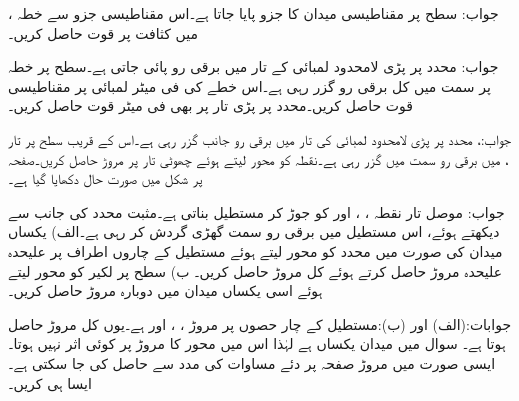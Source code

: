جواب:
سطح  پر مقناطیسی میدان کا  جزو  پایا جاتا ہے۔اس مقناطیسی جزو سے خطہ ،  میں کثافت  پر قوت حاصل کریں۔

جواب:
 محدد پر پڑی لامحدود لمبائی کے تار میں  برقی رو پائی جاتی ہے۔سطح  پر خطہ  پر  سمت میں کل  برقی رو گزر رہی ہے۔اس خطے کی فی میٹر لمبائی پر مقناطیسی قوت حاصل کریں۔محدد  پر پڑی تار پر بھی فی میٹر قوت حاصل کریں۔

جواب:، 
محدد  پر پڑی لامحدود لمبائی کی تار میں  برقی رو  جانب گزر رہی ہے۔اس کے قریب سطح  پر تار ،  میں  برقی رو  سمت میں گزر رہی ہے۔نقطہ  کو محور لیتے ہوئے چھوٹی تار پر مروڑ حاصل کریں۔صفحہ  پر شکل  میں صورت حال دکھایا گیا ہے۔

جواب:
موصل تار نقطہ ، ،  اور  کو جوڑ کر مستطیل بناتی ہے۔مثبت  محدد کی جانب سے دیکھتے ہوئے، اس مستطیل میں  برقی رو سمت گھڑی گردش کر رہی ہے۔الف)  یکساں میدان  کی صورت میں  محدد  کو محور لیتے ہوئے مستطیل کے چاروں اطراف پر علیحدہ علیحدہ  مروڑ حاصل کرتے ہوئے کل مروڑ حاصل کریں۔ ب) سطح  پر لکیر  کو محور لیتے ہوئے اسی یکساں میدان میں دوبارہ مروڑ حاصل کریں۔

جوابات:(الف) اور (ب):مستطیل کے چار حصوں پر مروڑ ، ،  اور  ہے۔یوں کل مروڑ  حاصل ہوتا ہے۔
سوال  میں میدان یکساں ہے لہٰذا اس میں محور کا مروڑ پر کوئی اثر نہیں ہوتا۔ایسی صورت میں مروڑ صفحہ  پر دئے  مساوات  کی مدد سے حاصل کی جا سکتی ہے۔ایسا ہی کریں۔

